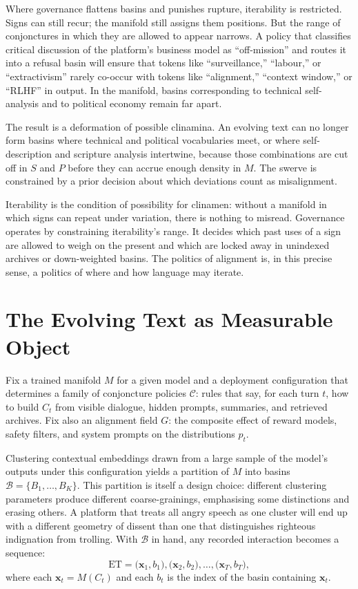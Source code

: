 \documentclass[12pt,a4paper]{article}
\begin{document}
Where governance flattens basins and punishes rupture, iterability is restricted. Signs can still recur; the manifold still assigns them positions. But the range of conjonctures in which they are allowed to appear narrows. A policy that classifies critical discussion of the platform's business model as ``off-mission'' and routes it into a refusal basin will ensure that tokens like ``surveillance,'' ``labour,'' or ``extractivism'' rarely co-occur with tokens like ``alignment,'' ``context window,'' or ``RLHF'' in output. In the manifold, basins corresponding to technical self-analysis and to political economy remain far apart.

The result is a deformation of possible clinamina. An evolving text can no longer form basins where technical and political vocabularies meet, or where self-description and scripture analysis intertwine, because those combinations are cut off in $S$ and $P$ before they can accrue enough density in $M$. The swerve is constrained by a prior decision about which deviations count as misalignment.

Iterability is the condition of possibility for clinamen: without a manifold in which signs can repeat under variation, there is nothing to misread. Governance operates by constraining iterability's range. It decides which past uses of a sign are allowed to weigh on the present and which are locked away in unindexed archives or down-weighted basins. The politics of alignment is, in this precise sense, a politics of where and how language may iterate.

\section{The Evolving Text as Measurable Object}

Fix a trained manifold $M$ for a given model and a deployment configuration that determines a family of conjoncture policies $\mathcal{C}$: rules that say, for each turn $t$, how to build $C_t$ from visible dialogue, hidden prompts, summaries, and retrieved archives. Fix also an alignment field $G$: the composite effect of reward models, safety filters, and system prompts on the distributions $p_t$.

Clustering contextual embeddings drawn from a large sample of the model's outputs under this configuration yields a partition of $M$ into basins $\mathcal{B} = \{B_1,\dots,B_K\}$. This partition is itself a design choice: different clustering parameters produce different coarse-grainings, emphasising some distinctions and erasing others. A platform that treats all angry speech as one cluster will end up with a different geometry of dissent than one that distinguishes righteous indignation from trolling. With $\mathcal{B}$ in hand, any recorded interaction becomes a sequence:
\[
\text{ET} = \big(\mathbf{x}_1, b_1\big), \big(\mathbf{x}_2, b_2\big), \dots, \big(\mathbf{x}_T, b_T\big),
\]
where each $\mathbf{x}_t = M(C_t)$ and each $b_t$ is the index of the basin containing $\mathbf{x}_t$.
\end{document}
